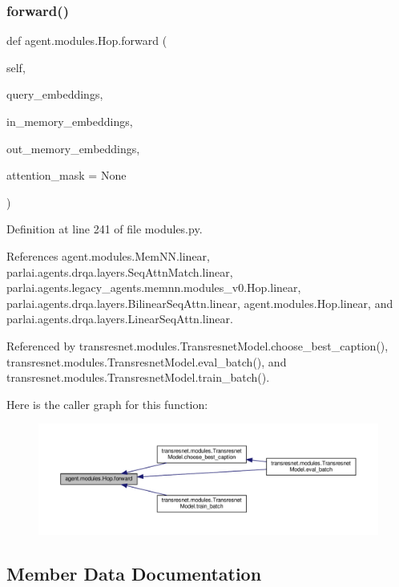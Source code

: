 \subsubsection{\texorpdfstring{forward()}{forward()}}
{\footnotesize\ttfamily def agent.\+modules.\+Hop.\+forward (\begin{DoxyParamCaption}\item[{}]{self,  }\item[{}]{query\+\_\+embeddings,  }\item[{}]{in\+\_\+memory\+\_\+embeddings,  }\item[{}]{out\+\_\+memory\+\_\+embeddings,  }\item[{}]{attention\+\_\+mask = {\ttfamily None} }\end{DoxyParamCaption})}



Definition at line 241 of file modules.\+py.



References agent.\+modules.\+Mem\+N\+N.\+linear, parlai.\+agents.\+drqa.\+layers.\+Seq\+Attn\+Match.\+linear, parlai.\+agents.\+legacy\+\_\+agents.\+memnn.\+modules\+\_\+v0.\+Hop.\+linear, parlai.\+agents.\+drqa.\+layers.\+Bilinear\+Seq\+Attn.\+linear, agent.\+modules.\+Hop.\+linear, and parlai.\+agents.\+drqa.\+layers.\+Linear\+Seq\+Attn.\+linear.



Referenced by transresnet.\+modules.\+Transresnet\+Model.\+choose\+\_\+best\+\_\+caption(), transresnet.\+modules.\+Transresnet\+Model.\+eval\+\_\+batch(), and transresnet.\+modules.\+Transresnet\+Model.\+train\+\_\+batch().

Here is the caller graph for this function\+:
\nopagebreak
\begin{figure}[H]
\begin{center}
\leavevmode
\includegraphics[width=350pt]{classagent_1_1modules_1_1Hop_a9b266c14ffbc2ae89147a1ade0b12897_icgraph}
\end{center}
\end{figure}


\subsection{Member Data Documentation}
\mbox{\label{classagent_1_1modules_1_1Hop_a9e81d98ac7db15a8fa8f03cfe85111cb}} 
